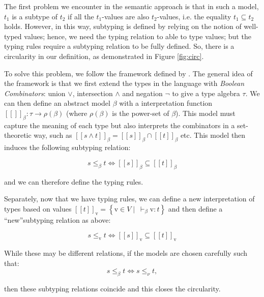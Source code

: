 \documentclass{l4proj}
\begin{document}
The first problem we encounter in the semantic approach is that in such a model, $t_{1}$ is a subtype of $t_{2}$ if all the $t_{1}$-values are also $t_{2}$-values, i.e. the equality $t_{1} \subseteq t_{2}$ holds.
However, in this way, subtyping is defined by relying on the notion of well-typed values; hence, we need the typing relation to able to type values; but the typing rules require a subtyping relation to be fully defined.
So, there is a circularity in our definition, as demonstrated in Figure \ref{fig:circ}.

To solve this problem, we follow the framework defined by \citet{Frisch2008}.
The general idea of the framework is that we first extend the types in the language with \emph{Boolean Combinators}: union $\lor$, intersection $\land$ and negation $\neg$ to give a type algebra $\tau$.
We can then define an abstract model $\beta$ with a interpretation function $[\![ ]\!]_{\beta} : \tau \to \rho(\beta)$ (where $\rho(\beta)$ is the power-set of $\beta$).
This model must capture the meaning of each type but also interprets the combinators in a set-theoretic way, such as $[\![s \land t]\!]_{\beta} = [\![s]\!]_{\beta} \cap [\![t]\!]_{\beta}$ etc.
This model then induces the following subtyping relation:

\begin{equation*}
    s \leq_{\beta} t \iff [\![s]\!]_{\beta} \subseteq [\![t]\!]_{\beta}
\end{equation*}

and we can therefore define the typing rules.

Separately, now that we have typing rules, we can define a new interpretation of types based on values $[\![t]\!]_{\mathrm{v}} = \left\{\mathrm{v} \in V \mid \: \vdash_{\beta} \mathrm{v} : t \right\}$ and then define a ``new''subtyping relation as above:

\begin{equation*}
    s \leq_{\mathrm{v}} t \iff [\![s]\!]_{\mathrm{v}} \subseteq [\![t]\!]_{\mathrm{v}}
\end{equation*}

While these may be different relations, if the models are chosen carefully such that:
\begin{equation*}
    s \leq_{\beta} t \iff s \leq_{\nu} t,
\end{equation*}

then these subtyping relations coincide and this closes the circularity.
\end{document}
